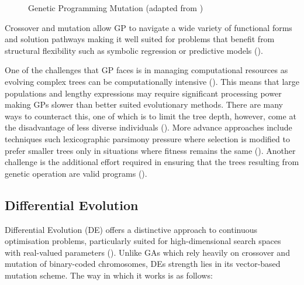\parbreak
\begin{figure}[H] %
	\centering %
	\caption{Genetic Programming Mutation (adapted from \cite{book_introduction_to_evolutionary_computing})}
	\label{fig:gp_mutation} %
\end{figure}

\parbreak\noindent Crossover and mutation allow GP to navigate a wide variety of functional forms and solution pathways making it well suited for problems that benefit from structural flexibility such as symbolic regression or predictive models (\cite{back2012handbook}).

\parbreak\noindent One of the challenges that GP faces is in managing computational resources as evolving complex trees can be computationally intensive (\cite{koza1994genetic}). This means that large populations and lengthy expressions may require significant processing power making GPs slower than better suited evolutionary methods. There are many ways to counteract this, one of which is to limit the tree depth, however, come at the disadvantage of less diverse individuals (\cite{koza1994genetic}). More advance approaches include techniques such lexicographic parsimony pressure where selection is modified to prefer smaller trees only in situations where fitness remains the same (\cite{luke2002lexicographic}). Another challenge is the additional effort required in ensuring that the trees resulting from genetic operation are valid programs (\cite{koza1994genetic}).

\subsection{Differential Evolution}
Differential Evolution (DE) offers a distinctive approach to continuous optimisation problems, particularly suited for high-dimensional search spaces with real-valued parameters (\cite{storn1995differential}). Unlike GAs which rely heavily on crossover and mutation of binary-coded chromosomes, DEs strength lies in its vector-based mutation scheme. The way in which it works is as follows:

